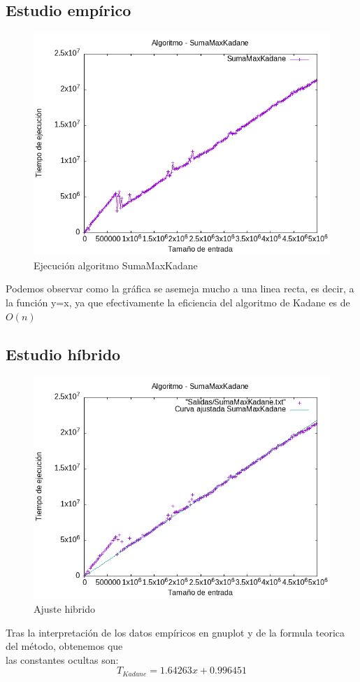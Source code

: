 \documentclass[11pt,openany]{book}
\begin{document}
\subsection{Estudio empírico}
\begin{center}
      \begin{figure}[H]
                  \centering
                  \includegraphics[width=0.7\linewidth]{assets/Img/SumaMaxKadane.png}
                  \caption{Ejecución algoritmo SumaMaxKadane}
                  \label{fig:SumaMaxKadane}
      \end{figure}
\end{center}
Podemos observar como la gráfica se asemeja mucho a una linea recta, es decir, a la función y=x, ya que efectivamente la eficiencia
del algoritmo de Kadane es de $O(n)$
\subsection{Estudio híbrido}
\begin{center}
      \begin{figure}[H]
                  \centering
                  \includegraphics[width=0.7\linewidth]{assets/Img/SumaMaxKadane_hib.png}
                  \caption{Ajuste hibrido}
                  \label{fig:SumaMaxKadanehibrido}
      \end{figure}
\end{center}
Tras la interpretación de los datos empíricos en gnuplot y de la formula teorica del método, obtenemos que \\
las constantes ocultas son:
\begin{equation*}
      T_{Kadane}=1.64263x + 0.996451
\end{equation*}
\end{document}
